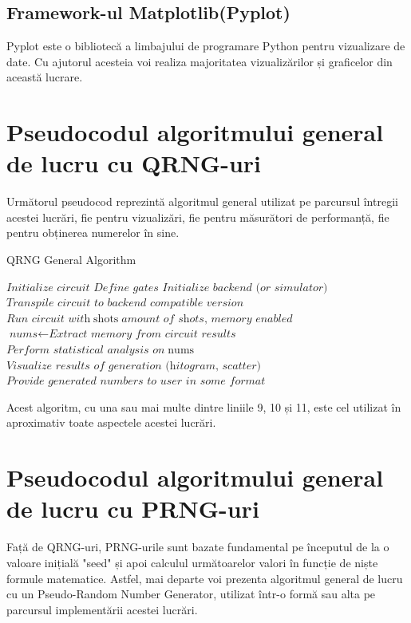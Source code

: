 \subsection{Framework-ul Matplotlib(Pyplot)}
Pyplot este o bibliotecă a limbajului de programare Python pentru vizualizare de date. Cu ajutorul acesteia voi realiza majoritatea vizualizărilor și graficelor din această lucrare.


\section{Pseudocodul algoritmului general de lucru cu QRNG-uri}
Următorul pseudocod reprezintă algoritmul general utilizat pe parcursul întregii acestei lucrări, fie pentru vizualizări, fie pentru măsurători de performanță, fie pentru obținerea numerelor în sine. 

\begin{algorithm}[H]
    \caption{QRNG General Algorithm}\label{alg:QRNG}
    \begin{algorithmic}[1]
           \State $\textit{Initialize circuit}$
           \State $\textit{Define gates}$
           \State $\textit{Initialize backend (or simulator)}$
           \State $\textit{Transpile circuit to backend compatible version}$
           \State $\textit{Run circuit with} \; \text{shots}\; \textit{amount of shots, memory enabled}$
           \State $\textit{nums} \gets \textit{Extract memory from circuit results}$
           \State $\textit{Perform statistical analysis on} \; \text{nums}$
           \State $\textit{Visualize results of generation (hitogram, scatter)}$
           \State $\textit{Provide generated numbers to user in some format}$
           \EndFor
        \EndProcedure
    \end{algorithmic}
\end{algorithm}

Acest algoritm, cu una sau mai multe dintre liniile 9, 10 și 11, este cel utilizat în aproximativ toate aspectele acestei lucrări.

\section{Pseudocodul algoritmului general de lucru cu PRNG-uri}
Față de QRNG-uri, PRNG-urile sunt bazate fundamental pe începutul de la o valoare inițială "seed" și apoi calculul următoarelor valori în funcție de niște formule matematice. Astfel, mai departe voi prezenta algoritmul general de lucru cu un Pseudo-Random Number Generator, utilizat într-o formă sau alta pe parcursul implementării acestei lucrări.

